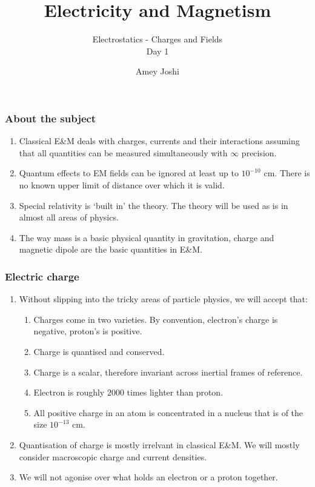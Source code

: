 \documentclass{beamer}
\title{Electricity and Magnetism}
\subtitle{Electrostatics - Charges and Fields \\ Day 1}
\author{Amey Joshi}
\begin{document}
\frame{\titlepage}

\begin{frame}
\frametitle{About the subject}
\begin{enumerate}
\item Classical E\&M deals with charges, currents and their interactions assuming that all quantities can be measured 
simultaneously with $\infty$ precision.
\item Quantum effects to EM fields can be ignored at least up to $10^{-10}$ cm.  There is no known upper limit of distance
over which it is valid.
\item Special relativity is `built in' the theory.
The theory will be used as is in almost all areas of physics.
\item The way mass is a basic physical quantity in gravitation, charge and magnetic dipole are the basic quantities in E\&M.

\end{enumerate}
\end{frame}

\begin{frame}
\frametitle{Electric charge}
\begin{enumerate}
\item Without slipping into the tricky areas of particle physics, we will accept that:
\begin{enumerate}
\item Charges come in two varieties. By convention, electron's charge is negative, proton's is positive.
\item Charge is quantised and conserved.
\item Charge is a scalar, therefore invariant across inertial frames of reference.
\item Electron is roughly $2000$ times lighter than proton. 
\item All positive charge in an atom is concentrated in a nucleus that is of the size $10^{-13}$ cm.
\end{enumerate}
\item Quantisation of charge is mostly irrelvant in classical E\&M. We will mostly consider macroscopic charge and current
densities.
\item We will not agonise over what holds an electron or a proton together.
\end{enumerate}
\end{frame}
\end{document}
